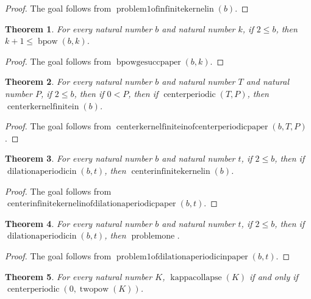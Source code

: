 \documentclass[11pt]{article}
\newtheorem{theorem}{Theorem}[section]
\theoremstyle{definition}
\begin{document}
\begin{proof}
The goal follows from \(\operatorname{problem1ofinfinitekernelin}(b)\).
\end{proof}
\begin{theorem}
\label{ll:observations:bpow-ge-succ-paper}
For every natural number \(b\) and natural number \(k\), if \(2 \le b\), then \(k + 1 \le \operatorname{bpow}(b, k)\).
\end{theorem}
\begin{proof}
The goal follows from \(\operatorname{bpowgesuccpaper}(b, k)\).
\end{proof}
\begin{theorem}
\label{ll:observations:center-kernel-finite-in-of-center-periodic-paper}
For every natural number \(b\) and natural number \(T\) and natural number \(P\), if \(2 \le b\), then if \(0 < P\), then if \(\operatorname{centerperiodic}(T, P)\), then \(\operatorname{centerkernelfinitein}(b)\).
\end{theorem}
\begin{proof}
The goal follows from \(\operatorname{centerkernelfiniteinofcenterperiodicpaper}(b, T, P)\).
\end{proof}
\begin{theorem}
\label{ll:observations:center-infinite-kernel-in-of-dilation-aperiodic-paper}
For every natural number \(b\) and natural number \(t\), if \(2 \le b\), then if \(\operatorname{dilationaperiodicin}(b, t)\), then \(\operatorname{centerinfinitekernelin}(b)\).
\end{theorem}
\begin{proof}
The goal follows from \(\operatorname{centerinfinitekernelinofdilationaperiodicpaper}(b, t)\).
\end{proof}
\begin{theorem}
\label{ll:observations:problem1-of-dilation-aperiodic-in-paper}
For every natural number \(b\) and natural number \(t\), if \(2 \le b\), then if \(\operatorname{dilationaperiodicin}(b, t)\), then \(\operatorname{problemone}\).
\end{theorem}
\begin{proof}
The goal follows from \(\operatorname{problem1ofdilationaperiodicinpaper}(b, t)\).
\end{proof}
\begin{theorem}
\label{ll:observations:kappa-collapse-iff}
For every natural number \(K\), \(\operatorname{kappacollapse}(K)\) if and only if \(\operatorname{centerperiodic}(0, \operatorname{twopow}(K))\).
\end{theorem}
\end{document}
